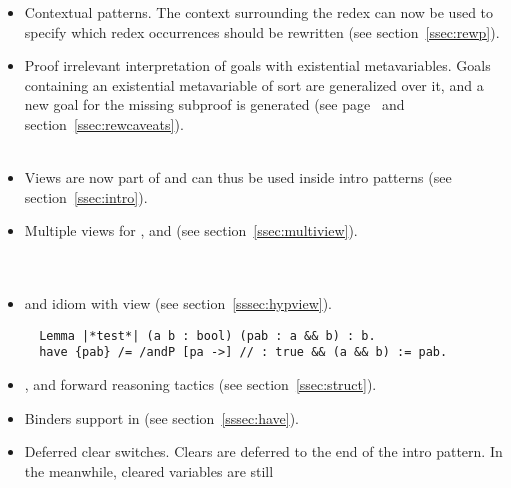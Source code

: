 \begin{itemize}
\item Contextual  patterns.
      The context surrounding the redex can now be used to specify which
      redex occurrences should be rewritten (see section~\ref{ssec:rewp}).\\
\item Proof irrelevant interpretation of goals with existential metavariables.
      Goals containing an existential metavariable of sort  are
      generalized over it, and a new goal for the missing subproof is
      generated (see page~\pageref{sssec:apply} and
      section~\ref{ssec:rewcaveats}).\\
      \\
\item Views are now part of  and can thus be used
      inside intro patterns (see section~\ref{ssec:intro}).\\
\item Multiple views for ,  and 
      (see section~\ref{ssec:multiview}).\\
      \\
      \\
\item {} and  idiom with view (see section~\ref{sssec:hypview}).
\begin{lstlisting}
  Lemma |*test*| (a b : bool) (pab : a && b) : b.
  have {pab} /= /andP [pa ->] // : true && (a && b) := pab.
\end{lstlisting}
\item {},  and  forward reasoning
      tactics (see section~\ref{ssec:struct}).\\
\item Binders support in  (see section~\ref{sssec:have}).\\
\item Deferred clear switches. Clears are deferred to the end of the
      intro pattern. In the meanwhile, cleared variables are still

\end{itemize}
